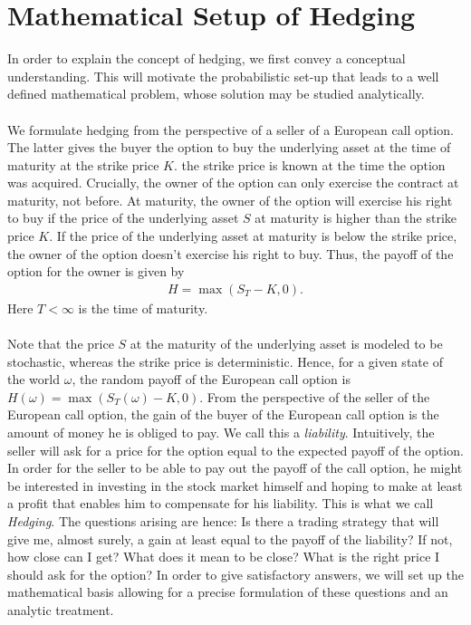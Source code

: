 \documentclass[11pt,a4paper,twoside,openany]{report}
\theoremstyle{plain} %
\theoremstyle{definition} %
\theoremstyle{remark} %
\begin{document}
\chapter{Mathematical Setup of Hedging}\label{ch:hedging}
In order to explain the concept of hedging, we first convey a conceptual understanding. This will motivate the probabilistic set-up that leads to a well defined mathematical problem, whose solution may be studied analytically.
\\\\
We formulate hedging from the perspective of a seller of a European call option. The latter gives the buyer the option to buy the underlying asset at the time of maturity at the strike price \(K\). the strike price is known at the time the option was acquired. Crucially, the owner of the option can only exercise the contract at maturity, not before. At maturity, the owner of the option will exercise his right to buy if the price of the underlying asset \(S\) at maturity is higher than the strike price \(K\). If the price of the underlying asset at maturity is below the strike price, the owner of the option doesn't exercise his right to buy. Thus, the payoff of the option for the owner is given by 
\begin{align}
    H = \max(S_T-K,0).
\end{align}
Here \(T<\infty\) is the time of maturity.
\\\\
Note that the price \(S\) at the maturity of the underlying asset is modeled to be stochastic, whereas the strike price is deterministic. Hence, for a given state of the world \(\omega\), the random payoff of the European call option is \(H(\omega)=\max(S_T(\omega)-K,0)\).
\bigbreak
From the perspective of the seller of the European call option, the gain of the buyer of the European call option is the amount of money he is obliged to pay. We call this a \textit{liability}. Intuitively, the seller will ask for a price for the option equal to the expected payoff of the option. In order for the seller to be able to pay out the payoff of the call option, he might be interested in investing in the stock market himself and hoping to make at least a profit that enables him to compensate for his liability. This is what we call \textit{Hedging}. The questions arising are hence: Is there a trading strategy that will give me, almost surely, a gain at least equal to the payoff of the liability? If not, how close can I get? What does it mean to be close? What is the right price I should ask for the option? In order to give satisfactory answers, we will set up the mathematical basis allowing for a precise formulation of these questions and an analytic treatment. 
\end{document}
